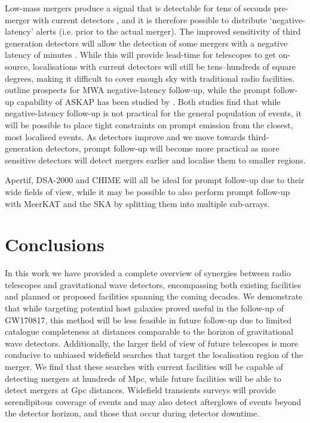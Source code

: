 Low-mass mergers produce a signal that is detectable for tens of seconds pre-merger with current detectors \citep{2018PhRvD..97l3014C}, and it is therefore possible to distribute `negative-latency' alerts (i.e. prior to the actual merger). The improved sensitivity of third generation detectors will allow the detection of some mergers with a negative latency of minutes \citep{2020arXiv200508830K}. While this will provide lead-time for telescopes to get on-source, localisations with current detectors will still be tens--hundreds of square degrees, making it difficult to cover enough sky with traditional radio facilities. \citet{2019MNRAS.489L..75J} outline prospects for MWA negative-latency follow-up, while the prompt follow-up capability of ASKAP has been studied by \citet{2020PASA...37...51W}. Both studies find that while negative-latency follow-up is not practical for the general population of events, it will be possible to place tight constraints on prompt emission from the closest, most localised events. As detectors improve and we move towards third-generation detectors, prompt follow-up will become more practical as more sensitive detectors will detect mergers earlier and localise them to smaller regions.

Apertif, DSA-2000 and CHIME will all be ideal for prompt follow-up due to their wide fields of view, while it may be possible to also perform prompt follow-up with MeerKAT and the SKA by splitting them into multiple sub-arrays.








\section{Conclusions}

In this work we have provided a complete overview of synergies between radio telescopes and gravitational wave detectors, encompassing both existing facilities and planned or proposed facilities spanning the coming decades. We demonstrate that while targeting potential host galaxies proved useful in the follow-up of GW170817, this method will be less feasible in future follow-up due to limited catalogue completeness at distances comparable to the horizon of gravitational wave detectors. Additionally, the larger field of view of future telescopes is more conducive to unbiased widefield searches that target the localisation region of the merger. We find that these searches with current facilities will be capable of detecting mergers at hundreds of Mpc, while future facilities will be able to detect mergers at Gpc distances. Widefield transients surveys will provide serendipitous coverage of events and may also detect afterglows of events beyond the detector horizon, and those that occur during detector downtime. 


